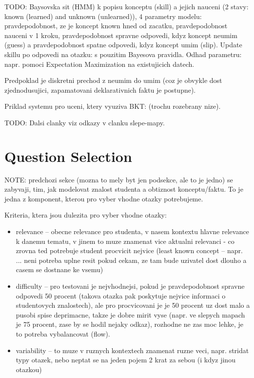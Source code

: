 \documentclass[a4paper, 12pt, twoside]{fithesis2}		%
\renewcommand{\_}{\leavevmode \kern0.0em\vbox{\hrule width0.4em}}
\newcommand{\squarebullet}{\textcolor{black}{\raisebox{0.15em}{\rule{4pt}{4pt}}}}
\newenvironment{myItemize}{
  \begin{itemize}[leftmargin=2em,rightmargin=1em,itemsep=\parskip ,parsep=0em,topsep=0em,partopsep=0em]
  \renewcommand{\labelitemi}{\squarebullet}
  \renewcommand{\labelitemii}{$\diamond$}
}{
  \end{itemize}
}
\begin{document}
TODO: Baysovska sit (HMM) k popisu konceptu (skill) a jejich nauceni (2 stavy: known (learned) and unknown (unlearned)), 4 parametry modelu: pravdepodobnost, ze je koncept known hned od zacatku, pravdepodobnost nauceni v 1 kroku, pravdepodobnost spravne odpovedi, kdyz koncept neumim (guess) a pravdepodobnost spatne odpovedi, kdyz koncept umim (slip).
Update skillu po odpovedi na otazku: s pouzitim Bayesova pravidla.
Odhad parametru: napr. pomoci Expectation Maximization na existujicich datech.

Predpoklad je diskretni prechod z neumim do umim (coz je obvykle dost zjednodusujici, zapamatovani deklarativnich faktu je postupne).

Priklad systemu pro uceni, ktery vyuziva BKT: \cite{question-gen-adapt-bayes} (trochu rozebrany nize).

TODO: Dalsi clanky viz odkazy v clanku slepe-mapy.


\section{Question Selection}
\label{sec:question-selection}

NOTE: predchozi sekce (mozna to mely byt jen podsekce, ale to je jedno) se zabyvaji, tim, jak modelovat znalost studenta a obtiznost konceptu/faktu. To je jedna z komponent, kterou pro vyber vhodne otazky potrebujeme.

Kriteria, ktera jsou dulezita pro vyber vhodne otazky:

\begin{myItemize}
  \item relevance -- obecne relevance pro studenta, v nasem kontextu hlavne relevance k danemu tematu, v jinem to muze znamenat vice aktualni relevanci - co zrovna ted potrebuje student procvicit nejvice (least known concept -- napr. \cite{question-gen-adapt-bayes} ... neni potreba uplne resit pokud cekam, ze tam bude uzivatel dost dlouho a casem se dostnane ke vsemu)
  \item difficulty -- pro testovani je nejvhodnejsi, pokud je pravdepodobnost spravne odpovedi 50 procent (takova otazka pak poskytuje nejvice informaci o studentovych znalostech), ale pro procvicovani je je 50 procent uz dost malo a pusobi spise deprimacne, takze je dobre mirit vyse (napr. ve slepych mapach je 75 procent, zase by se hodil nejaky odkaz), rozhodne ne zas moc lehke, je to potreba vybalancovat (flow).
  \item variability -- to muze v ruznych kontextech znamenat ruzne veci, napr. stridat typy otazek, nebo neptat se na jeden pojem 2 krat za sebou (i kdyz jinou otazkou)
\end{myItemize}
\end{document}

